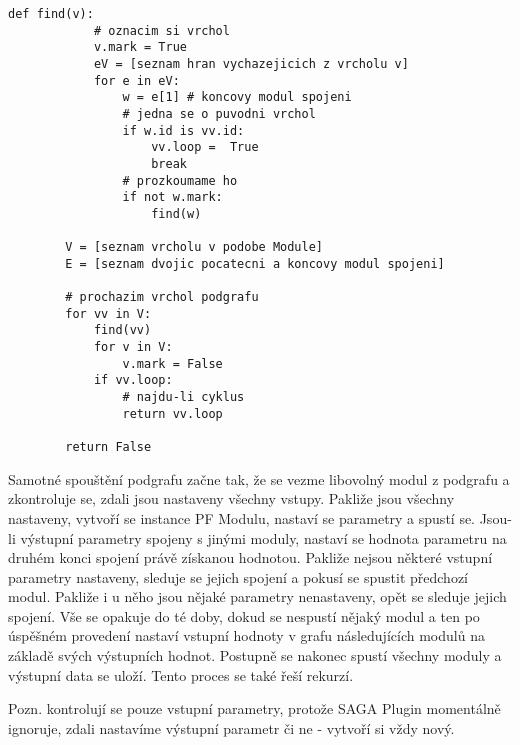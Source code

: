 \newpage
\begin{lstlisting}[label=findLoop,caption={Hledání cyklu v podgrafu},morekeywords={find}]
        def find(v):
        	# oznacim si vrchol
            v.mark = True
            eV = [seznam hran vychazejicich z vrcholu v]            
            for e in eV:
                w = e[1] # koncovy modul spojeni
                # jedna se o puvodni vrchol
                if w.id is vv.id:
                    vv.loop =  True
                    break
                # prozkoumame ho
                if not w.mark:
                    find(w)
        
        V = [seznam vrcholu v podobe Module]
        E = [seznam dvojic pocatecni a koncovy modul spojeni]

        # prochazim vrchol podgrafu
        for vv in V:
            find(vv)
            for v in V:
                v.mark = False
            if vv.loop:
            	# najdu-li cyklus
                return vv.loop

        return False
\end{lstlisting}

Samotné spouštění podgrafu začne tak, že se vezme libovolný modul z
podgrafu a zkontroluje se, zdali jsou nastaveny všechny
vstupy. Pakliže jsou všechny nastaveny, vytvoří se instance PF Modulu,
nastaví se parametry a spustí se. Jsou-li výstupní parametry spojeny s
jinými moduly, nastaví se hodnota parametru na druhém konci spojení
právě získanou hodnotou. Pakliže nejsou některé vstupní parametry
nastaveny, sleduje se jejich spojení a pokusí se spustit předchozí
modul. Pakliže i u něho jsou nějaké parametry nenastaveny, opět se
sleduje jejich spojení. Vše se opakuje do té doby, dokud se nespustí
nějaký modul a ten po úspěšném provedení nastaví vstupní hodnoty v
grafu následujících modulů na základě svých výstupních
hodnot. Postupně se nakonec spustí všechny moduly a výstupní data se
uloží. Tento proces se také řeší rekurzí.

Pozn. kontrolují se pouze vstupní parametry, protože SAGA Plugin
momentálně ignoruje, zdali nastavíme výstupní parametr či ne - vytvoří
si vždy nový.
